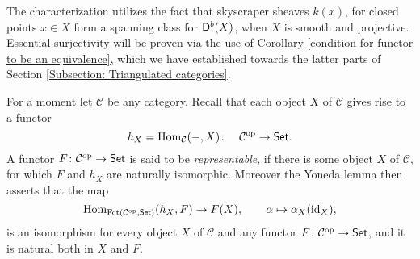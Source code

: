 The characterization utilizes the fact that skyscraper sheaves $k(x)$, for closed points $x \in X$ form a spanning class for $\mathsf{D}^b(X)$, when $X$ is smooth and projective. 
Essential surjectivity will be proven via the use of Corollary \ref{condition for functor to be an equivalence}, which we have established towards the latter parts of Section \ref{Subsection: Triangulated categories}.



\vspace{0.3cm}
For a moment let $\mathcal C$ be any category. Recall that each object $X$ of $\mathcal C$ gives rise to a functor 
\[
    h_X = \operatorname{Hom}_{\mathcal C}(-, X) \colon  \quad \mathcal C^{\text{op}} \to \mathsf{Set}.
\]
A functor $F \colon \mathcal C^{\text{op}} \to \mathsf{Set}$ is said to be \emph{representable}, if there is some object $X$ of $\mathcal C$, for which $F$ and $h_X$ are naturally isomorphic. Moreover the Yoneda lemma then asserts that the map  
\begin{equation}
    \label{eq: nat iso of Yoneda}
    \operatorname{Hom}_{\operatorname{Fct(\mathcal C^{\text{op}}, \mathsf{Set})}}(h_X, F) \to F(X), \qquad \alpha \mapsto \alpha_X(\operatorname{id}_{X}),
\end{equation}
is an isomorphism for every object $X$ of $\mathcal C$ and any functor $F \colon \mathcal C ^{\text{op}} \to \mathsf{Set}$, and it is natural both in $X$ and $F$.

